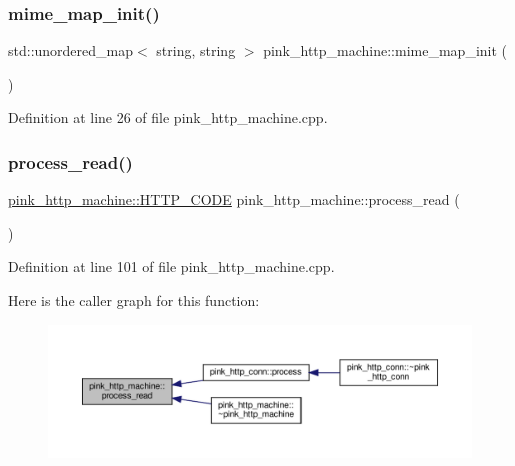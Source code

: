 \subsubsection{\texorpdfstring{mime\+\_\+map\+\_\+init()}{mime\_map\_init()}}
{\footnotesize\ttfamily std\+::unordered\+\_\+map$<$ string, string $>$ pink\+\_\+http\+\_\+machine\+::mime\+\_\+map\+\_\+init (\begin{DoxyParamCaption}{ }\end{DoxyParamCaption})\hspace{0.3cm}{\ttfamily [static]}}



Definition at line 26 of file pink\+\_\+http\+\_\+machine.\+cpp.

\mbox{\label{classpink__http__machine_a7c937bd8da6bdfbf4894e6af9a712d60}} 
\subsubsection{\texorpdfstring{process\+\_\+read()}{process\_read()}}
{\footnotesize\ttfamily \hyperlink{classpink__http__machine_afb1e590cd61676c2f8859c4e01e5b150}{pink\+\_\+http\+\_\+machine\+::\+H\+T\+T\+P\+\_\+\+C\+O\+DE} pink\+\_\+http\+\_\+machine\+::process\+\_\+read (\begin{DoxyParamCaption}{ }\end{DoxyParamCaption})}



Definition at line 101 of file pink\+\_\+http\+\_\+machine.\+cpp.

Here is the caller graph for this function\+:
\nopagebreak
\begin{figure}[H]
\begin{center}
\leavevmode
\includegraphics[width=350pt]{classpink__http__machine_a7c937bd8da6bdfbf4894e6af9a712d60_icgraph}
\end{center}
\end{figure}
\mbox{\label{classpink__http__machine_a7144e4279cd09ab8ce56873bd3906f24}} 
